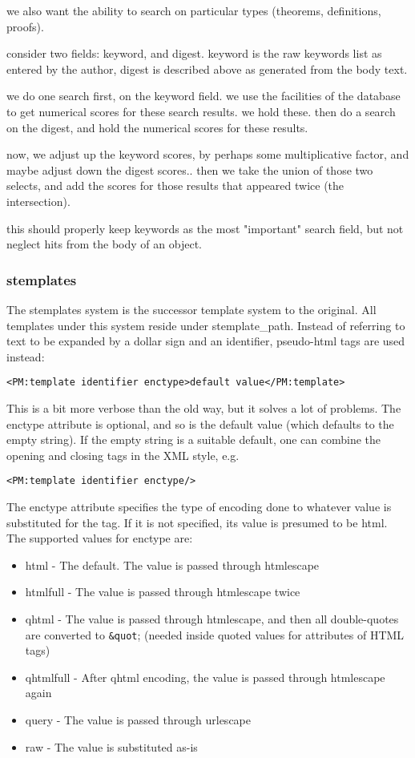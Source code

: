we also want the ability to search on particular types (theorems, definitions, proofs).  

consider two fields: keyword, and digest.  keyword is the raw keywords list as entered by the author, digest is described above as generated from the body text. 

we do one search first, on the keyword field.  we use the facilities of the database to get numerical scores for these search results.  we hold these.  then do a search on the digest, and hold the numerical scores for these results.

now, we adjust up the keyword scores, by perhaps some multiplicative factor, and maybe adjust down the digest scores.. then we take the union of those two selects, and add the scores for those results that appeared twice (the intersection).

this should properly keep keywords as the most "important" search field, but not neglect hits from the body of an object.

\subsubsection*{stemplates}

The stemplates system is the successor template system to the original.
All templates under this system reside under stemplate\_path.  Instead of
referring to text to be expanded by a dollar sign and an identifier,
pseudo-html tags are used instead:

\verb|<PM:template identifier enctype>default value</PM:template>|

This is a bit more verbose than the old way, but it solves a lot of
problems.  The enctype attribute is optional, and so is the default
value (which defaults to the empty string).  If the empty string is a
suitable default, one can combine the opening and closing tags in the XML
style, e.g.

\verb|<PM:template identifier enctype/>|

The enctype attribute specifies the type of encoding done to whatever value
is substituted for the tag.  If it is not specified, its value is presumed to
be html.  The supported values for enctype are:

\begin{itemize}
\item html - The default.  The value is passed through htmlescape
\item htmlfull - The value is passed through htmlescape twice
\item qhtml - The value is passed through htmlescape, and then all
             double-quotes are converted to \verb|&quot|; (needed inside quoted
             values for attributes of HTML tags)
\item qhtmlfull - After qhtml encoding, the value is passed through
                 htmlescape again
\item query - The value is passed through urlescape
\item raw - The value is substituted as-is
\end{itemize}


